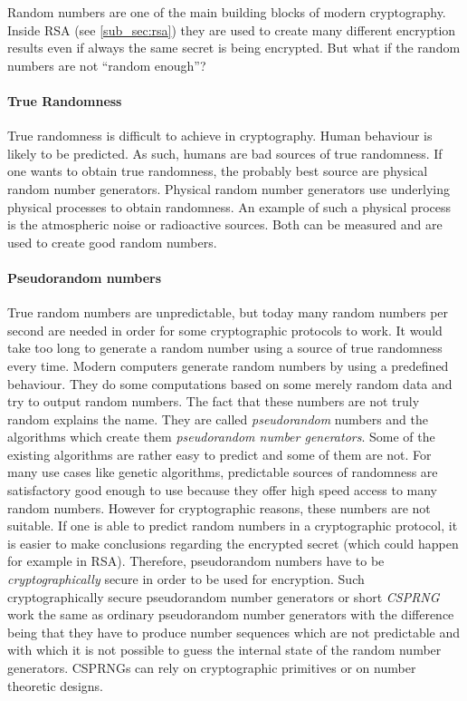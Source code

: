Random numbers are one of the main building blocks of modern cryptography.
Inside RSA (see \ref{sub_sec:rsa}) they are used to create many different encryption results even
if always the same secret is being encrypted. But what if the random numbers
are not ``random enough''?

\paragraph{True Randomness}
True randomness is difficult to achieve in cryptography. Human behaviour
is likely to be predicted. As such, humans are bad sources of true randomness.
If one wants to obtain true randomness, the probably best source are physical
random number generators. Physical random number generators use underlying
physical processes to obtain randomness. An example of such a physical process
is the atmospheric noise or radioactive sources. Both can be measured and
are used to create good random numbers.

\paragraph{Pseudorandom numbers}
True random numbers are unpredictable, but today many random numbers per
second are needed in order for some cryptographic protocols to work. It would
take too long to generate a random number using a source of true randomness
every time. Modern computers generate random numbers by using a predefined behaviour.
They do some computations based on some merely random data and try to output
random numbers. The fact that these numbers are not truly random explains the name.
They are called \textit{pseudorandom} numbers  and the algorithms which create
them \textit{pseudorandom number generators}. Some of the existing algorithms
are rather easy to predict and some of them are not. For many use cases like
genetic algorithms, predictable sources of randomness are satisfactory
good enough to use because they offer high speed access to many random numbers.
However for cryptographic reasons, these numbers are not suitable. If one is
able to predict random numbers in a cryptographic protocol, it is easier to
make conclusions regarding the encrypted secret (which could happen for example
in RSA). Therefore, pseudorandom numbers have to be \textit{cryptographically}
secure in order to be used for encryption. Such cryptographically secure pseudorandom
number generators or short \textit{CSPRNG} work the same as ordinary pseudorandom
number generators with the difference being that they have to produce number sequences
which are not predictable and with which it is not possible to guess the internal
state of the random number generators. CSPRNGs can rely on cryptographic primitives
or on number theoretic designs.

